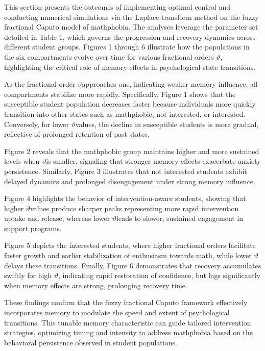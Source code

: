 \documentclass[10pt]{NSP1}
\begin{document}
This section presents the outcomes of implementing optimal control and conducting numerical simulations via the Laplace transform method on the fuzzy fractional Caputo model of mathphobia. The analyses leverage the parameter set detailed in Table 1, which governs the progression and recovery dynamics across different student groups. Figures 1 through 6 illustrate how the populations in the six compartments evolve over time for various fractional orders \(\vartheta\), highlighting the critical role of memory effects in psychological state transitions.

As the fractional order \(\vartheta\)approaches one, indicating weaker memory influence, all compartments stabilize more rapidly. Specifically, Figure 1 shows that the susceptible student population decreases faster because individuals more quickly transition into other states such as mathphobic, not interested, or interested. Conversely, for lower \(\vartheta\)values, the decline in susceptible students is more gradual, reflective of prolonged retention of past states.

Figure 2 reveals that the mathphobic group maintains higher and more sustained levels when \(\vartheta\)is smaller, signaling that stronger memory effects exacerbate anxiety persistence. Similarly, Figure 3 illustrates that not interested students exhibit delayed dynamics and prolonged disengagement under strong memory influence.

Figure 4 highlights the behavior of intervention-aware students, showing that higher \(\vartheta\)values produce sharper peaks representing more rapid intervention uptake and release, whereas lower \(\vartheta\)leads to slower, sustained engagement in support programs.

Figure 5 depicts the interested students, where higher fractional orders facilitate faster growth and earlier stabilization of enthusiasm towards math, while lower \(\vartheta\)delays these transitions. Finally, Figure 6 demonstrates that recovery accumulates swiftly for high \(\vartheta\), indicating rapid restoration of confidence, but lags significantly when memory effects are strong, prolonging recovery time.

These findings confirm that the fuzzy fractional Caputo framework effectively incorporates memory to modulate the speed and extent of psychological transitions. This tunable memory characteristic can guide tailored intervention strategies, optimizing timing and intensity to address mathphobia based on the behavioral persistence observed in student populations.
\end{document}
